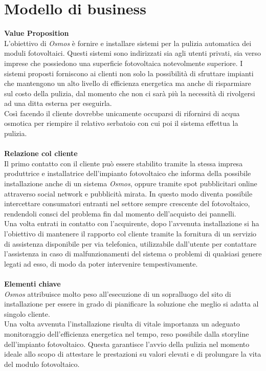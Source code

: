 \documentclass[a4paper, 12pt]{article}
\begin{document}
	\section{Modello di business}
	\textbf{Value Proposition}\\
	L'obiettivo di \emph{Osmos} è fornire e installare sistemi per la pulizia automatica dei moduli fotovoltaici. Questi sistemi sono indirizzati sia agli utenti privati, sia verso imprese che possiedono una superficie fotovoltaica notevolmente superiore. I sistemi proposti forniscono ai clienti non solo la possibilità di sfruttare impianti che mantengono un alto livello di efficienza energetica ma anche di risparmiare sul costo della pulizia, dal momento che non ci sarà più la necessità di rivolgersi ad una ditta esterna per eseguirla.\\
	Così facendo il cliente dovrebbe unicamente occuparsi di rifornirsi di acqua osmotica per riempire il relativo serbatoio con cui poi il sistema effettua la pulizia.\\\\
	\textbf{Relazione col cliente}\\
	Il primo contatto con il cliente può essere stabilito tramite la stessa impresa produttrice e installatrice dell'impianto fotovoltaico che informa della possibile installazione anche di un sistema \emph{Osmos}, oppure tramite spot pubblicitari online attraverso social network e pubblicità mirata. In questo modo diventa possibile intercettare consumatori entranti nel settore sempre crescente del fotovoltaico, rendendoli consci del problema fin dal momento dell'acquisto dei pannelli.\\
	Una volta entrati in contatto con l'acquirente, dopo l'avvenuta installazione si ha l'obiettivo di mantenere il rapporto col cliente tramite la fornitura di un servizio di assistenza disponibile per via telefonica, utilizzabile dall'utente per contattare l'assistenza in caso di malfunzionamenti del sistema o problemi di qualsiasi genere legati ad esso, di modo da poter intervenire tempestivamente.\\\\
	\textbf{Elementi chiave}\\
	\emph{Osmos} attribuisce molto peso all'esecuzione di un sopralluogo del sito di installazione per essere in grado di pianificare la soluzione che meglio si adatta al singolo cliente.\\
	Una volta avvenuta l'installazione risulta di vitale importanza un adeguato monitoraggio dell'efficienza energetica nel tempo, reso possibile dalla storyline dell'impianto fotovoltaico. Questa garantisce l'avvio della pulizia nel momento ideale allo scopo di attestare le prestazioni su valori elevati e di prolungare la vita del modulo fotovoltaico.\\
\end{document}
